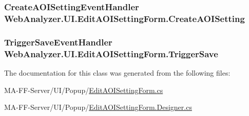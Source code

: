 \subsubsection[{Create\+A\+O\+I\+Setting}]{\setlength{\rightskip}{0pt plus 5cm}Create\+A\+O\+I\+Setting\+Event\+Handler Web\+Analyzer.\+U\+I.\+Edit\+A\+O\+I\+Setting\+Form.\+Create\+A\+O\+I\+Setting}\label{class_web_analyzer_1_1_u_i_1_1_edit_a_o_i_setting_form_a1841845af65ba0e224742710ddefb772}
\hypertarget{class_web_analyzer_1_1_u_i_1_1_edit_a_o_i_setting_form_a5333229783b91948ba94f0ed0a947c6d}{}
\subsubsection[{Trigger\+Save}]{\setlength{\rightskip}{0pt plus 5cm}Trigger\+Save\+Event\+Handler Web\+Analyzer.\+U\+I.\+Edit\+A\+O\+I\+Setting\+Form.\+Trigger\+Save}\label{class_web_analyzer_1_1_u_i_1_1_edit_a_o_i_setting_form_a5333229783b91948ba94f0ed0a947c6d}


The documentation for this class was generated from the following files\+:\begin{DoxyCompactItemize}
\item 
M\+A-\/\+F\+F-\/\+Server/\+U\+I/\+Popup/\hyperlink{_edit_a_o_i_setting_form_8cs}{Edit\+A\+O\+I\+Setting\+Form.\+cs}\item 
M\+A-\/\+F\+F-\/\+Server/\+U\+I/\+Popup/\hyperlink{_edit_a_o_i_setting_form_8_designer_8cs}{Edit\+A\+O\+I\+Setting\+Form.\+Designer.\+cs}\end{DoxyCompactItemize}
